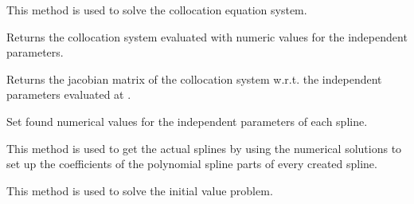 \documentclass[letterpaper,10pt,english]{sphinxmanual}
\begin{document}
\begin{fulllineitems}

\begin{fulllineitems}
\label{pytrajectory:pytrajectory.trajectory.Trajectory.solveEQS}
This method is used to solve the collocation equation system.

\end{fulllineitems}


\begin{fulllineitems}
\label{pytrajectory:pytrajectory.trajectory.Trajectory.G}
Returns the collocation system evaluated with numeric values for the
independent parameters.

\end{fulllineitems}


\begin{fulllineitems}
\label{pytrajectory:pytrajectory.trajectory.Trajectory.DG}
Returns the jacobian matrix of the collocation system w.r.t. the
independent parameters evaluated at .

\end{fulllineitems}


\begin{fulllineitems}
\label{pytrajectory:pytrajectory.trajectory.Trajectory.setCoeff}
Set found numerical values for the independent parameters of each spline.

This method is used to get the actual splines by using the numerical
solutions to set up the coefficients of the polynomial spline parts of
every created spline.

\end{fulllineitems}


\begin{fulllineitems}
\label{pytrajectory:pytrajectory.trajectory.Trajectory.simulateIVP}
This method is used to solve the initial value problem.


\end{fulllineitems}
\end{fulllineitems}
\end{document}
